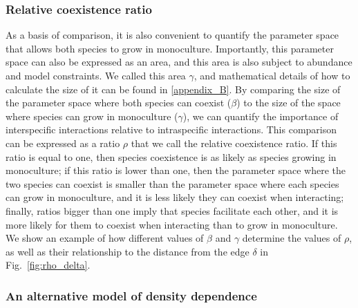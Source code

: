 \begin{refsection}
\subsubsection*{Relative coexistence ratio}

As a basis of comparison, it is also convenient to quantify the parameter space that allows both species to grow in monoculture. Importantly, this parameter space can also be expressed as an area, and this area is also subject to abundance and model constraints. We called this area $\gamma$, and mathematical details of how to calculate the size of it can be found in \autoref{appendix_B}. By comparing the size of the parameter space where both species can coexist ($\beta$) to the size of the space where species can grow in monoculture ($\gamma$), we can quantify the importance of interspecific interactions relative to intraspecific interactions. This comparison can be expressed as a ratio $\rho$ that we call the relative coexistence ratio. If this ratio is equal to one, then species coexistence is as likely as species growing in monoculture; if this ratio is lower than one, then the parameter space where the two species can coexist is smaller than the parameter space where each species can grow in monoculture,  and it is less likely they can coexist when interacting; finally, ratios bigger than one imply that species facilitate each other, and it is more likely for them to coexist when interacting than to grow in monoculture. We show an example of how different values of $\beta$ and $\gamma$ determine the values of $\rho$, as well as their relationship to the distance from the edge $\delta$ in Fig.~\ref{fig:rho_delta}.

\subsubsection*{An alternative model of density dependence}



\end{refsection}
